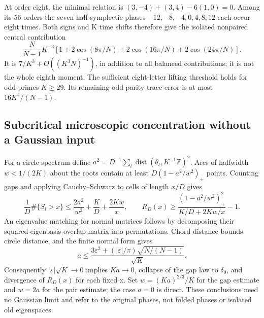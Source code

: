 At order eight, the minimal relation is
$(3,-4)+(3,4)-6(1,0)=0$. Among its 56 orders the seven half-symplectic phases
$-12,-8,-4,0,4,8,12$ each occur eight times. Both signs and K time shifts
therefore give the isolated nonpaired central contribution
\[
 \frac{N}{N-1}K^{-3}
  [1+2\cos(8\pi/N)+2\cos(16\pi/N)+2\cos(24\pi/N)].
\]
It is $7/K^3+O((K^3N)^{-1})$, in addition to all balanced contributions;
it is not the whole eighth moment. The sufficient eight-letter lifting
threshold holds for odd primes $K\geq29$. Its remaining odd-parity trace
error is at most $16K^4/(N-1)$.

\subsection{Subcritical microscopic concentration without a Gaussian input}
For a circle spectrum define $a^2=D^{-1}\sum_l\operatorname{dist}
(\theta_l,K^{-1}\mathbb Z)^2$. Arcs of halfwidth $w<1/(2K)$ about the roots
contain at least $D(1-a^2/w^2)_+$ points. Counting gaps and applying
Cauchy--Schwarz to cells of length $x/D$ gives
\[
 \frac1D\#\{S_l>x\}\leq\frac{2a^2}{w^2}+\frac KD+\frac{2Kw}{x},
 \qquad
 R_D(x)\geq\frac{(1-a^2/w^2)_+^2}{K/D+2Kw/x}-1.
\]
An eigenvalue matching for normal matrices follows by decomposing their
squared-eigenbasis-overlap matrix into permutations. Chord distance bounds
circle distance, and the finite normal form gives
\[
 a\leq\frac{3\varepsilon^2+
            (|\varepsilon|/\pi)\sqrt{N/(N-1)}}{\sqrt K}.
\]
Consequently $|\varepsilon|\sqrt K\to0$ implies $Ka\to0$, collapse of the
gap law to $\delta_0$, and divergence of $R_D(x)$ for each fixed x. Set
$w=(Ka)^{2/3}/K$ for the gap estimate and $w=2a$ for the pair estimate;
the case $a=0$ is direct. These conclusions need no Gaussian limit and
refer to the original phases, not folded phases or isolated old eigenspaces.
